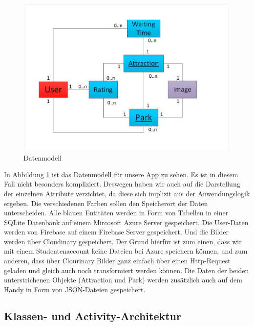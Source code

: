 \begin{figure}[htp]
	\centering
  	\includegraphics[width=0.99\textwidth]{img/modelle/Datenmodell.png}
	\caption{Datenmodell}
	\label{figure:architketurDatenmodell}
\end{figure}

In Abbildung \ref{figure:architketurDatenmodell} ist das Datenmodell für unsere App zu sehen. Es ist in diesem Fall nicht besonders kompliziert. Deswegen haben wir auch auf die Darstellung der einzelnen Attribute verzichtet, da diese sich implizit aus der Anwendungslogik ergeben. Die verschiedenen Farben sollen den Speicherort der Daten unterscheiden. Alle blauen Entitäten werden in Form von Tabellen in einer SQLite Datenbank auf einem Mircosoft Azure Server gespeichert. Die User-Daten werden von Firebase auf einem Firebase Server gespeichert. Und die Bilder werden über Cloudinary gespeichert. Der Grund hierfür ist zum einen, dass wir mit einem Studentenaccount keine Dateien bei Azure speichern können, und zum anderen, dass über Clourinary Bilder ganz einfach über einen Http-Request geladen und gleich auch noch transformiert werden können. Die Daten der beiden unterstrichenen Objekte (Attraction und Park) werden zusätzlich auch auf dem Handy in Form von JSON-Dateien gespeichert.

\subsection{Klassen- und Activity-Architektur}
\label{sec:implementierung:architektur:klassenmodell}

